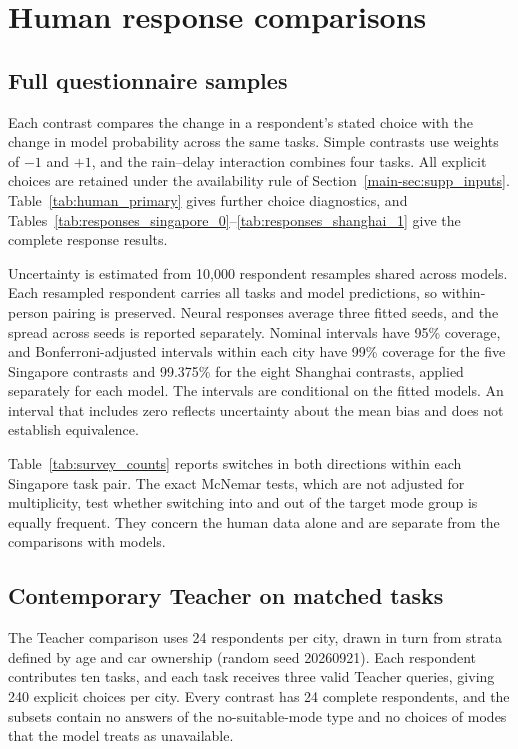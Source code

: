 \section{Human response comparisons}
\label{sec:supp_human}
\subsection{Full questionnaire samples}
Each contrast compares the change in a respondent's stated choice with the change in model probability across the same tasks. Simple contrasts use weights of $-1$ and $+1$, and the rain--delay interaction combines four tasks. All explicit choices are retained under the availability rule of Section~\ref{main-sec:supp_inputs}. Table~\ref{tab:human_primary} gives further choice diagnostics, and Tables~\ref{tab:responses_singapore_0}--\ref{tab:responses_shanghai_1} give the complete response results.

Uncertainty is estimated from 10,000 respondent resamples shared across models. Each resampled respondent carries all tasks and model predictions, so within-person pairing is preserved. Neural responses average three fitted seeds, and the spread across seeds is reported separately. Nominal intervals have 95\% coverage, and Bonferroni-adjusted intervals within each city have 99\% coverage for the five Singapore contrasts and 99.375\% for the eight Shanghai contrasts, applied separately for each model. The intervals are conditional on the fitted models. An interval that includes zero reflects uncertainty about the mean bias and does not establish equivalence.

\FloatBarrier


Table~\ref{tab:survey_counts} reports switches in both directions within each Singapore task pair. The exact McNemar tests, which are not adjusted for multiplicity, test whether switching into and out of the target mode group is equally frequent. They concern the human data alone and are separate from the comparisons with models.

\FloatBarrier

\subsection{Contemporary Teacher on matched tasks}
\label{sec:teacher_revision}
The Teacher comparison uses 24 respondents per city, drawn in turn from strata defined by age and car ownership (random seed 20260921). Each respondent contributes ten tasks, and each task receives three valid Teacher queries, giving 240 explicit choices per city. Every contrast has 24 complete respondents, and the subsets contain no answers of the no-suitable-mode type and no choices of modes that the model treats as unavailable.

